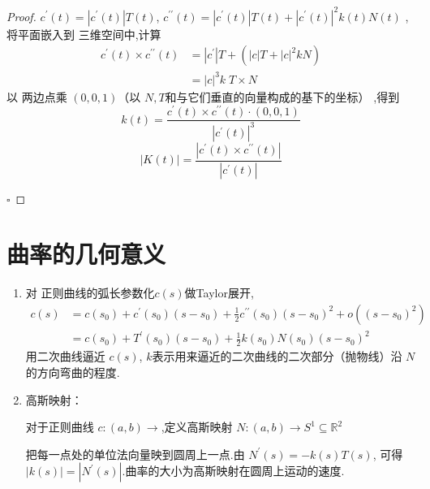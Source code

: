 \documentclass[../../古典微分几何.tex]{subfiles}
\begin{document}
\begin{proof}
    \(  c^{\prime} \left( t \right)= \left| c^{\prime} \left( t \right)  \right|T\left( t \right)     \), \(  c ^{\prime \prime} \left( t \right)= \left| c^{\prime} \left( t \right)  \right| T\left( t \right)+ \left| c^{\prime} \left( t \right)  \right| ^{2} k\left( t \right)N\left( t \right)        \)  ,
    将平面嵌入到 三维空间中,计算 \[
   \begin{aligned}
    c^{\prime} \left( t \right)\times  c ^{\prime \prime} \left( t \right) &   =  \left| c^{\prime}  \right|T +  \left( \left| c \right|T +  \left| c \right|^{2} kN   \right)   \\ 
     & =   \left| c \right|^{3} k\;T\times N 
   \end{aligned}
    \]以 两边点乘 \(  \left( 0,0,1 \right)   \)（以 \(  N,T  \)和与它们垂直的向量构成的基下的坐标） ,得到 \[
    k\left( t \right)=  \frac{c^{\prime} \left( t \right)\times  c ^{\prime \prime} \left( t \right) \cdot \left( 0,0,1 \right)    }{\left| c^{\prime} \left( t \right)  \right|^{3}  }  
    \]  \[
    \left| K\left( t \right)  \right| =  \frac{\left| c^{\prime} \left( t \right)\times  c ^{\prime \prime} \left( t \right)   \right|  }{\left| c^{\prime} \left( t \right)  \right|  }  
    \]

    \hfill $\square$
\end{proof}

\section{曲率的几何意义}

\begin{enumerate}
    \item 对 正则曲线的弧长参数化\(  c\left( s \right)   \)做Taylor展开, \[
        \begin{aligned}
            c\left( s \right)& = c\left( s_0 \right)+  c^{\prime} \left( s_0 \right)\left( s-s_0 \right)+  \frac{1}{2}c ^{\prime \prime} \left( s_0 \right)\left( s-s_0 \right)^{2}+  o\left( \left( s-s_0 \right)^{2}  \right)       \\ 
             & =   c\left( s_0 \right)+  T^{\prime} \left( s_0 \right)\left( s-s_0 \right)+  \frac{1}{2} k\left( s_0 \right)N\left( s_0 \right)\left( s-s_0 \right)^{2}     
        \end{aligned}
        \] 
        用二次曲线逼近 \(  c\left( s \right)   \), \(  k  \)表示用来逼近的二次曲线的二次部分（抛物线）沿 \(  N  \)的方向弯曲的程度.   

    \item 高斯映射：
    

    对于正则曲线 \(  c :\left( a,b \right)\to   \),定义高斯映射 
     \(  N: \left( a,b \right)\to S^{1}\subseteq \mathbb{R} ^{2}   \) 

     把每一点处的单位法向量映到圆周上一点.由 \(  N^{\prime} \left( s \right)=  -k\left( s \right)T\left( s \right)     \), 可得\(  \left| k\left( s \right)  \right|= \left| N^{\prime} \left( s \right)  \right|    \).曲率的大小为高斯映射在圆周上运动的速度.  
\end{enumerate}
\end{document}

